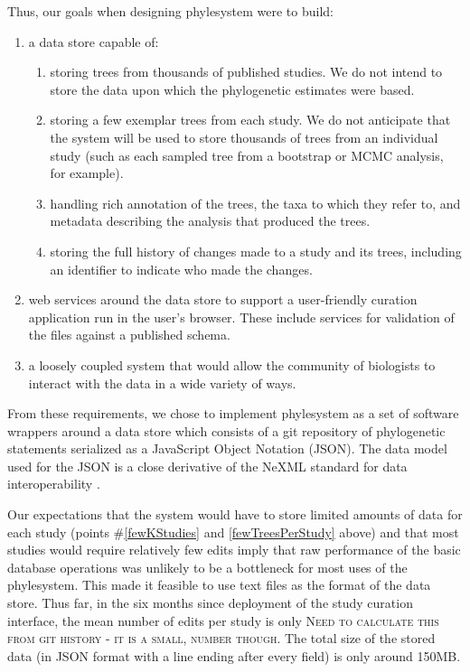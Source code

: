 \documentclass{bioinfo}
\newcommand{\ps}{phylesystem\xspace}
\newcommand{\js}{JavaScript\xspace}
\newcommand{\mthcomment}[1]{{\color{red} \textsc{#1}}\xspace}
\begin{document}
Thus, our goals when designing \ps were to build: 
\begin{enumerate}
    \item  a data store capable of:
        \begin{enumerate}
            \item \label{fewKStudies} storing trees from thousands of published studies. We do not intend to store the 
                data upon which the phylogenetic estimates were based.
            \item \label{fewTreesPerStudy} storing a few exemplar trees from each study. We do not anticipate that the system will be used 
                to store thousands of trees from 
                an individual study (such as each sampled tree from a bootstrap or MCMC analysis, for example).
            \item \label{richAnnot} handling rich annotation of the trees, the taxa to which they refer to, and metadata describing 
                the analysis that produced the trees.
            \item \label{history} storing the full history of changes made to a study and its trees,
                including an identifier to indicate who made the changes.
        \end{enumerate}
    \item \label{ws} web services around the data store to support a user-friendly curation application run in the user's browser. These include services for validation of the files against a published schema.
    \item \label{looseOpen} a loosely coupled system that would allow the community of biologists to interact with the data in a wide variety of ways.
\end{enumerate}
From these requirements, we chose to implement \ps as a set of software wrappers around a data store
    which consists of a git \citep{git} repository of phylogenetic statements serialized as a \js Object Notation (JSON).
The data model used for the JSON is a close derivative of the NeXML standard for data interoperability \citep{NeXML}.

Our expectations that the system would have to store limited amounts of data for each study 
    (points \#\ref{fewKStudies} and \ref{fewTreesPerStudy} above) and that most
    studies would require relatively few edits imply that
    raw performance of the basic database operations was unlikely to be a bottleneck for most
    uses of the \ps.
This made it feasible to use text files as the format of the data store.
Thus far, in the six months since deployment of the study curation interface, the mean number of edits 
    per study is only \mthcomment{Need to calculate this from git history - it is a small, number though}.
The total size of the stored data (in JSON format with a line ending after 
    every field) is only around 150MB.
\end{document}
